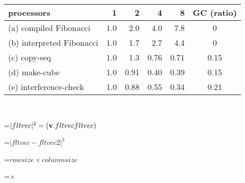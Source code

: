 {\newpage
\clearpage
\samepage 
\begin{table}\begin{center}
\begin{tabular}{|l|r|r|r|r|c|}  \hline
processors & 1 & 2 & 4 & 8 & GC (ratio) \\  \hline
(a) compiled Fibonacci & 1.0 & 2.0 & 4.0 & 7.8 & 0 \\  \hline
(b) interpreted Fibonacci & 1.0 & 1.7 & 2.7 & 4.4 & 0 \\  \hline
(c) copy-seq & 1.0 & 1.3 & 0.76 & 0.71 & 0.15 \\  \hline
(d) make-cube & 1.0 & 0.91 & 0.40 & 0.39 &  0.15 \\  \hline
(e) interference-check & 1.0 & 0.88 & 0.55 & 0.34 & 0.21 \\  \hline
\end{tabular} \\ 

\end{center}
\end{table}
}

{\newpage
\clearpage
\samepage 
}

{\newpage
\clearpage
\samepage 
\setbox\sizebox=\hbox{$|fltvec|^2=({\bf v.} fltvec fltvec)$}\box\sizebox
}

{\newpage
\clearpage
\samepage 
\setbox\sizebox=\hbox{$|fltvec-fltvec2|^2$}\box\sizebox
}

{\newpage
\clearpage
\samepage 
\setbox\sizebox=\hbox{$rowsize \times columnsize$}\box\sizebox
}

{\newpage
\clearpage
\samepage 
\setbox\sizebox=\hbox{$\times$}\box\sizebox
}

